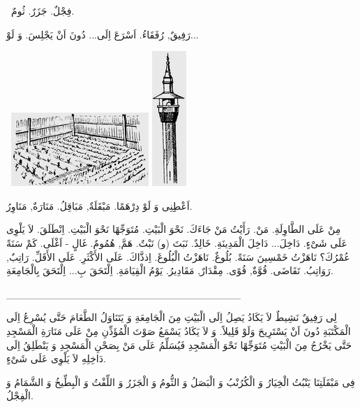 \documentclass[a5paper]{article}
\begin{document}
\ فِجْلٌ. جَزَرٌ. ثُومٌ.

رَفِيقٌ, رُفَقَاءُ. اَسْرَعَ اِلَى... دُونَ اَنْ يَجْلِسَ. وَ لَوْ... 

\  \includegraphics[width=2.052in,height=1.0937in]{MuhammadBagauddinlatinized-img245.png}   \includegraphics[width=0.5102in,height=2.0102in]{MuhammadBagauddinlatinized-img246.png} 

اَعْطِِنِى وَ لَوْ دِرْهَمًا. مَبْقَلَةٌ, مَبَاقِلُ. مَنَارَةٌ, مَنَاوِرُ. 

مِنْ عَلَى الطَّاوِلَةِ. مَنْ. رَأَيْتُ مَنْ جَاءَكَ. نَحْوَ الْبَيْتِ. مُتَوَجِّهًا نَحْوَ الْبَيْتِ. اِنْطَلَقَ. لاَ يَلْوِى عَلَى شَىْءٍ. دَاخِلَ... دَاخِلَ الْمَدِينَةِ. خَالِدٌ. نَبَتَ (و) نَبْتٌ. هَمَّ, هُمُومٌ. غَالٍ - اَغْلَى. كَمْ سَنَةً عُمْرُكَ؟ نَاهَزْتُ خَمْسِينَ سَنَةً. بُلُوغٌ. نَاهَزْتُ الْبُلُوغَ. اِذذَّاكَ. عَلَى الأَكْثَرِ. عَلَى الأَقَلِّ. رَاتِبٌ, رَوَاتِبُ. تَقَاضَى. قُوَّةٌ, قُوًى. مِقْدَارٌ, مَقَادِيرُ. يَوْمُ الْقِيَامَةِ. اِلْتَحَقَ بِ... اِلْتَحَقَ بِالْجَامِعَةِ.

\_\_\_\_\_\_\_\_\_\_\_\_\_\_\_\_\_\_\_\_\_\_\_\_\_\_\_\_\_\_\_\_

لِى رَفِيقٌ نَشِيطٌ لاَ يَكَادُ يَصِلُ اِلَى الْبَيْتِ مِنَ الْجَامِعَةِ وَ يَتَنَاوَلُ الطَّعَامَ حَتَّى يُسْرِعُ اِلَى الْمَكْتَبَةِ دُونَ اَنْ يَسْتَرِيحَ وَلَوْ قَلِيلاً. وَ لاَ يَكَادُ يَسْمَعُ صَوْتَ الْمُؤَذِّنِ مِنْ عَلَى مَنَارَةِ الْمَسْجِدِ حَتَّى يَخْرُجُ مِنَ الْبَيْتِ مُتَوَجِّهًا نَحْوَ الْمَسْجِدِ فَيُسَلِّمُ عَلَى مَنْ بِصَحْنِ الْمَسْجِدِ وَ يَنْطَلِقُ اِلَى دَاخِلِهِ لاَ يَلْوِى عَلَى شَىْءٍ.

فِى مَبْقَلَتِنَا يَنْبُتُ الْخِيَارُ وَ الْكُرُنْبُ وَ الْبَصَلُ وَ الثُّومُ وَ الْجَزَرُ وَ اللِّفْتُ وَ الْبِطِّيخُ وَ الشَّمَامُ وَ الْفِجْلُ.
\end{document}
